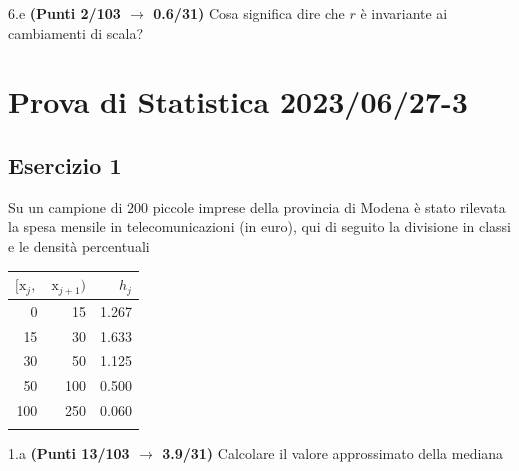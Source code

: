 \documentclass[
  11pt,
]{book}
\theoremstyle{mytheoremstyle}
\theoremstyle{mydefstyle}
\begin{document}
6.e \textbf{(Punti 2/103 \(\rightarrow\) 0.6/31)} Cosa significa dire che \(r\) è invariante ai cambiamenti di scala?

\section{Prova di Statistica 2023/06/27-3}\label{prova-di-statistica-20230627-3}

\subsection{Esercizio 1}\label{esercizio-1-30}

Su un campione di \(200\) piccole imprese della provincia di Modena è stato rilevata la spesa mensile in telecomunicazioni (in euro), qui di seguito
la divisione in classi e le densità percentuali

\begin{table}[H]
\centering
\begin{tabular}{rrr}
\toprule
$[\text{x}_j,$ & $\text{x}_{j+1})$ & $h_j$\\
\midrule
0 & 15 & 1.267\\
15 & 30 & 1.633\\
30 & 50 & 1.125\\
50 & 100 & 0.500\\
100 & 250 & 0.060\\
 &  & \\
\bottomrule
\end{tabular}
\end{table}

1.a \textbf{(Punti 13/103 \(\rightarrow\) 3.9/31)} Calcolare il valore approssimato della mediana
\end{document}
